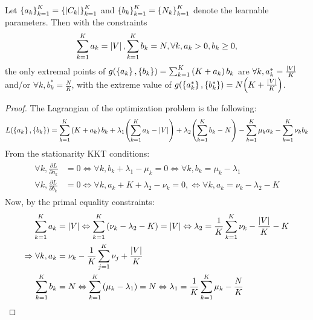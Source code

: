 \begin{lemma}
    \label{lemma:kkt_evaluation_cost}
    Let $\mathopen{}\left\{a_k\right\}_{k=1}^{K}=\mathopen{}\left\{\mathopen{}\left|C_k\right|\right\}_{k=1}^{K}$ and $\mathopen{}\left\{b_k\right\}_{k=1}^{K}=\mathopen{}\left\{N_k\right\}_{k=1}^{K}$ denote the learnable parameters. Then with the constraints 
    \begin{equation}
    \sum_{k=1}^{K}{a_k}=\mathopen{}\left|V\right|, \sum_{k=1}^{K}{b_k}=N, \forall k, a_k > 0, b_k \geq 0,
    \end{equation}
    the only extremal points of $g\mathopen{}\left(\mathopen{}\left\{a_k\right\},\mathopen{}\left\{b_k\right\}\right)=\sum_{k=1}^{K}{\mathopen{}\left(K + a_k\right)b_k}$ are $\forall k, a^*_k = \frac{\mathopen{}\left|V\right|}{K}$ and/or $\forall k, b^*_k = \frac{N}{K}$, with the extreme value of $g\mathopen{}\left(\mathopen{}\left\{a^*_k\right\},\mathopen{}\left\{b^*_k\right\}\right)=N\mathopen{}\left(K + \frac{\mathopen{}\left|V\right|}{K}\right)$.
\end{lemma}
    \begin{proof}
        The Lagrangian of the optimization problem is the following:
        \begin{equation}
         L\mathopen{}\left(\mathopen{}\left\{a_k\right\},\mathopen{}\left\{b_k\right\}\right) = \sum_{k=1}^{K}{\mathopen{}\left(K + a_k\right)b_k} + \lambda_1 \mathopen{}\left(\sum_{k=1}^{K}{a_k} - \mathopen{}\left|V\right|\right) + \lambda_2 \mathopen{}\left(\sum_{k=1}^{K}{b_k} - N\right)
             - \sum_{k=1}^{K}{\mu_k a_k} - \sum_{k=1}^{K}{\nu_k b_k}
        \end{equation}
    From the stationarity KKT conditions:
    \begin{align}
    \begin{split}
        \forall k, \frac{\partial L}{\partial a_k} &= 0 \Leftrightarrow \forall k, b_k + \lambda_1 - \mu_k = 0 \Leftrightarrow  \forall k, b_k = \mu_k - \lambda_1 \\
        \forall k, \frac{\partial L}{\partial b_k} &= 0 \Leftrightarrow \forall k, a_k + K + \lambda_2 - \nu_k = 0, \Leftrightarrow \forall k, a_k = \nu_k - \lambda_2 - K
    \end{split}
    \end{align}
    Now, by the primal equality constraints:
    \begin{align}
    \begin{split}
        \sum_{k=1}^{K}{a_k} &= \abs{V} \Leftrightarrow \sum_{k=1}^{K}{\of{\nu_k - \lambda_2 - K}} = \abs{V} \Leftrightarrow \lambda_2 = \frac{1}{K} \sum_{k=1}^{K}{\nu_k} - \frac{\abs{V}}{K} - K \\
        \Rightarrow \forall k, a_k &= \nu_k - \frac{1}{K} \sum_{j=1}^{K}{\nu_j} + \frac{\abs{V}}{K} \\
        \sum_{k=1}^{K}{b_k} &= N \Leftrightarrow \sum_{k=1}^{K}{\of{\mu_k - \lambda_1}} = N \Leftrightarrow \lambda_1 = \frac{1}{K} \sum_{k=1}^{K}{\mu_k} - \frac{N}{K} \\

\end{split}
\end{align}
\end{proof}
